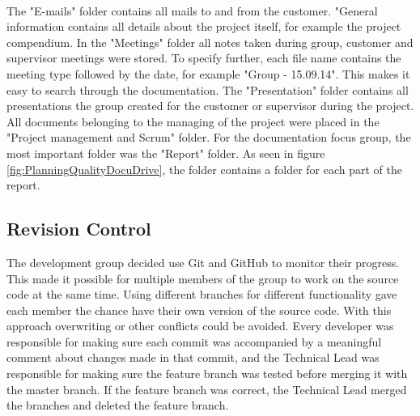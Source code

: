 \paragraph{} The "E-mails" folder contains all mails to and from the customer. "General information contains all details about the project itself, for example the project compendium. In the "Meetings" folder all notes taken during group, customer and supervisor meetings were stored. To specify further, each file name contains the meeting type followed by the date, for example "Group - 15.09.14". This makes it easy to search through the documentation. The "Presentation" folder contains all presentations the group created for the customer or supervisor during the project. All documents belonging to the managing of the project were placed in the "Project management and Scrum" folder. For the documentation focus group, the most important folder was the "Report" folder. As seen in figure \ref{fig:PlanningQualityDocuDrive}, the folder contains a folder for each part of the report.

\subsection{Revision Control}
\label{subsec:PlanningQualityRev}
The development group decided use Git and GitHub to monitor their progress. This made it possible for multiple members of the group to work on the source code at the same time. 
Using different branches for different functionality gave each member the chance have their own version of the source code. With this approach overwriting or other conflicts could be avoided. Every developer was responsible for making sure each commit was accompanied by a meaningful comment about changes made in that commit, and the Technical Lead was responsible for making sure the feature branch was tested before merging it with the master branch. If the feature branch was correct, the Technical Lead merged the branches and deleted the feature branch.

